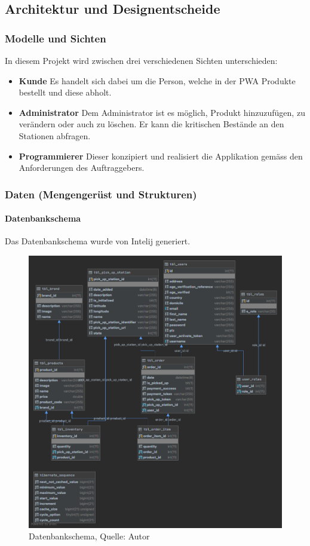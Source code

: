 \subsection{Architektur und Designentscheide}
\subsubsection{Modelle und Sichten}
In diesem Projekt wird zwischen drei verschiedenen Sichten unterschieden:
\begin{itemize}
    \item \textbf{Kunde} Es handelt sich dabei um die Person, welche in der \ac{PWA} Produkte bestellt und diese abholt. 
    \item \textbf{Administrator} Dem Administrator ist es möglich, Produkt hinzuzufügen, zu verändern oder auch zu löschen. Er kann die kritischen Bestände an den Stationen abfragen. 
    \item \textbf{Programmierer} Dieser konzipiert und realisiert die Applikation gemäss den Anforderungen des Auftraggebers.
\end{itemize}
\newpage
\subsubsection{Daten (Mengengerüst und Strukturen)}
\paragraph{Datenbankschema}
Das Datenbankschema wurde von Intelij generiert. 
\begin{figure}[H]
    \centering
    \includegraphics[width=1\textwidth]{images/databaseSchema.png}
    \caption[Datenbankschema]{Datenbankschema, Quelle: Autor}
    \label{img: datebankschema}
\end{figure}
\newpage
